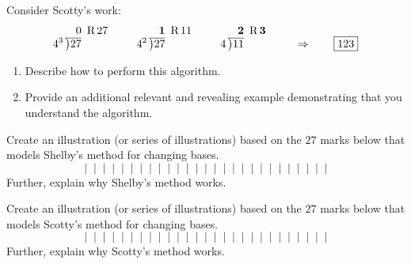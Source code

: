 \begin{prob} Consider Scotty's work:
\[
4^3\,\begin{tabular}[b]{@{}r@{} r}
$0$ &\, R\,$27$\\ \cline{1-1}
\big)\begin{tabular}[t]{@{}l@{}}
$27$ 
\end{tabular}
\end{tabular}
\qquad
4^2\,\begin{tabular}[b]{@{}r@{} r}
$\boldsymbol{1}$ &\, R\,$11$\\ \cline{1-1}
\big)\begin{tabular}[t]{@{}l@{}}
$27$ 
\end{tabular}
\end{tabular}
\qquad
4\,\begin{tabular}[b]{@{}r@{} r}
$\boldsymbol{2}$ &\, R\,$\boldsymbol{3}$\\ \cline{1-1}
\big)\begin{tabular}[t]{@{}l@{}}
$11$ 
\end{tabular}
\end{tabular} \qquad \Rightarrow \qquad \fbox{$123$}
\]
\begin{enumerate}
\item Describe how to perform this algorithm.
\item Provide an additional relevant and revealing example
  demonstrating that you understand the algorithm.
\end{enumerate}
\end{prob}

\begin{prob} 
Create an illustration (or series of illustrations) based on the $27$
marks below that models Shelby's method for changing bases.
\[
|\;\;|\;\;|\;\;|\;\;|\;\;|\;\;|\;\;|\;\;|\;\;|\;\;|\;\;|\;\;|\;\;|\;\;|\;\;|\;\;|\;\;|\;\;|\;\;|\;\;|\;\;|\;\;|\;\;|\;\;|\;\;|\;\;|
\]
Further, explain why Shelby's method works. 
\end{prob}

\begin{prob} 
Create an illustration (or series of illustrations) based on the $27$
marks below that models Scotty's method for changing bases.
\[
|\;\;|\;\;|\;\;|\;\;|\;\;|\;\;|\;\;|\;\;|\;\;|\;\;|\;\;|\;\;|\;\;|\;\;|\;\;|\;\;|\;\;|\;\;|\;\;|\;\;|\;\;|\;\;|\;\;|\;\;|\;\;|\;\;|
\]
Further, explain why Scotty's method works. 
\end{prob}
